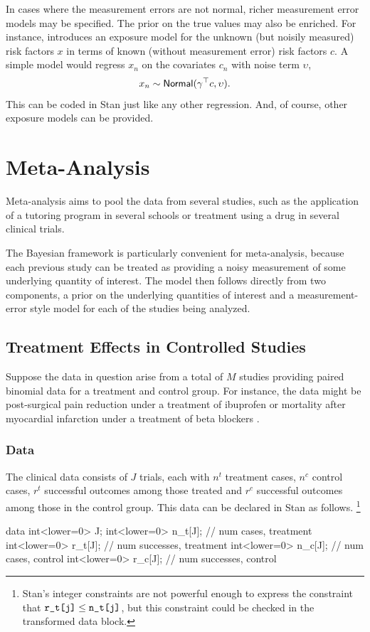 In cases where the measurement errors are not normal, richer
measurement error models may be specified.  The prior on the true
values may also be enriched.  For instance, \citep{Clayton:1992}
introduces an exposure model for the unknown (but noisily measured)
risk factors $x$ in terms of known (without measurement error) risk
factors $c$.  A simple model would regress $x_n$ on the covariates
$c_n$ with noise term $\upsilon$,
\[
x_n \sim \distro{Normal}(\gamma^{\top}c, \upsilon).
\]
This can be coded in Stan just like any other regression.  And, of
course, other exposure models can be provided.


\section{Meta-Analysis}

Meta-analysis aims to pool the data from several studies, such as the
application of a tutoring program in several schools or treatment
using a drug in several clinical trials.  

The Bayesian framework is particularly convenient for meta-analysis,
because each previous study can be treated as providing a noisy
measurement of some underlying quantity of interest.  The model then
follows directly from two components, a prior on the underlying
quantities of interest and a measurement-error style model for each of
the studies being analyzed.

\subsection{Treatment Effects in Controlled Studies}

Suppose the data in question arise from a total of $M$ studies
providing paired binomial data for a treatment and control group.  For
instance, the data might be post-surgical pain reduction under a treatment
of ibuprofen \citep{WarnThompsonSpiegelhalter:2002} or mortality after
myocardial infarction under a treatment of beta blockers
\citep[Section~5.6]{GelmanEtAl:2013}.

\subsubsection{Data}

The clinical data consists of $J$ trials, each with $n^t$ treatment
cases, $n^c$ control cases, $r^t$ successful outcomes among those treated and
$r^c$ successful outcomes among those in the control group.  This data
can be declared in Stan as follows.%
%
\footnote{Stan's integer constraints are not powerful enough to express the
constraint that $\mbox{\code{r\_t[j]}} \leq \mbox{\code{n\_t[j]}}$,
but this constraint could be checked in the transformed data block.}
%
\begin{stancode}
data {
  int<lower=0> J;
  int<lower=0> n_t[J];  // num cases, treatment
  int<lower=0> r_t[J];  // num successes, treatment
  int<lower=0> n_c[J];  // num cases, control
  int<lower=0> r_c[J];  // num successes, control
}
\end{stancode}
%

